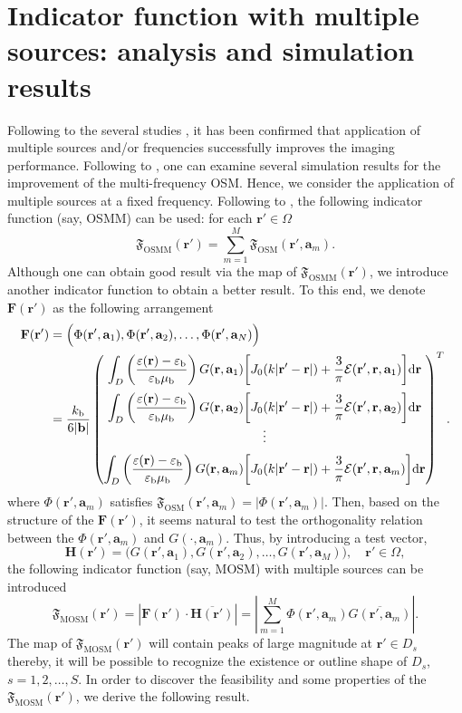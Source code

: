 \documentclass[3p,10pt]{elsarticle}
\newcommand{\eps}{\varepsilon}
\newcommand{\kb}{k_{\mathrm{b}}}
\newcommand{\epsb}{\varepsilon_{\mathrm{b}}}
\newcommand{\mub}{\mu_{\mathrm{b}}}
\newcommand{\rd}{\mathrm{d}}
\newcommand{\ma}{\mathbf{a}}
\newcommand{\mb}{\mathbf{b}}
\newcommand{\mr}{\mathbf{r}}
\newcommand{\mF}{\mathbf{F}}
\newcommand{\mH}{\mathbf{H}}
\DeclareMathOperator*{\osm}{OSM}
\DeclareMathOperator*{\osmm}{OSMM}
\DeclareMathOperator*{\mosm}{MOSM}
\theoremstyle{plain}
\theoremstyle{remark}
\begin{document}
\section{Indicator function with multiple sources: analysis and simulation results}\label{sec:5}
Following to the several studies \cite{ACP,AGJKLSW,AGKPS,P-SUB3,P-SUB16,P-SUB18,P1}, it has been confirmed that application of multiple sources and/or frequencies successfully improves the imaging performance. Following to \cite{BIPAC,P1}, one can examine  several simulation results for the improvement of the multi-frequency OSM. Hence, we consider the application of multiple sources at a fixed frequency. Following to \cite{P1}, the following indicator function (say, OSMM) can be used: for each $\mr'\in\Omega$
\[\mathfrak{F}_{\osmm}(\mr')=\sum_{m=1}^{M}\mathfrak{F}_{\osm}(\mr',\ma_m).\]
Although one can obtain good result via the map of $\mathfrak{F}_{\osmm}(\mr')$, we introduce another indicator function to obtain a better result. To this end, we denote $\mF(\mr')$ as the following arrangement
\begin{align*}
\mF(\mr')&=\Big(\Phi(\mr',\ma_1),\Phi(\mr',\ma_2),\ldots,\Phi(\mr',\ma_N)\Big)\\
&=\frac{\kb}{6|\mb|}\begin{pmatrix}
\medskip\displaystyle\int_D\left(\frac{\eps(\mr)-\epsb}{\epsb\mub}\right)G(\mr,\ma_1)\bigg[J_0(k|\mr'-\mr|)+\frac{3}{\pi}\mathcal{E}(\mr',\mr,\ma_1)\bigg]\rd\mr\\
\displaystyle\int_D\left(\frac{\eps(\mr)-\epsb}{\epsb\mub}\right)G(\mr,\ma_2)\bigg[J_0(k|\mr'-\mr|)+\frac{3}{\pi}\mathcal{E}(\mr',\mr,\ma_2)\bigg]\rd\mr\\
\medskip\vdots\\
\displaystyle\int_D\left(\frac{\eps(\mr)-\epsb}{\epsb\mub}\right)G(\mr,\ma_m)\bigg[J_0(k|\mr'-\mr|)+\frac{3}{\pi}\mathcal{E}(\mr',\mr,\ma_m)\bigg]\rd\mr
\end{pmatrix}^T.
\end{align*}
where $\Phi(\mr',\ma_m)$ satisfies $\mathfrak{F}_{\osm}(\mr',\ma_m)=|\Phi(\mr',\ma_m)|$.
Then, based on the structure of the $\mF(\mr')$, it seems natural to test the orthogonality relation between the $\Phi(\mr',\ma_m)$ and $G(\cdot,\ma_m)$. Thus, by introducing a test vector,
\[\mH(\mr')=\Big(G(\mr',\ma_1),G(\mr',\ma_2),\ldots,G(\mr',\ma_M)\Big),\quad\mr'\in\Omega,\]
the following indicator function (say, MOSM) with multiple sources can be introduced
\[\mathfrak{F}_{\mosm}(\mr')=|\mF(\mr')\cdot\overline{\mH(\mr')}|=\left|\sum_{m=1}^{M}\Phi(\mr',\ma_m)\overline{G(\mr',\ma_m)}\right|.\]
The map of $\mathfrak{F}_{\mosm}(\mr')$ will contain peaks of large magnitude at $\mr'\in D_s$ thereby, it will be possible to recognize the existence or outline shape of $D_s$, $s=1,2,\ldots,S$. In order to discover the feasibility and some properties of the $\mathfrak{F}_{\mosm}(\mr')$, we derive the following result.
\end{document}
